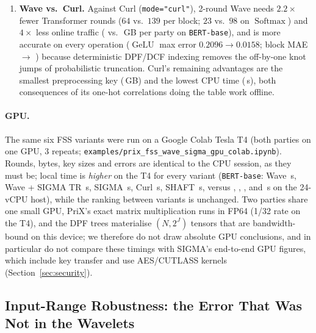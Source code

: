 \documentclass[11pt]{article}
\begin{document}
\begin{enumerate}
    \item \textbf{Wave vs.\ Curl.} Against Curl (\texttt{mode="curl"}), 2-round Wave needs $2.2\times$ fewer Transformer rounds ($64$ vs.\ $139$ per block; $23$ vs.\ $98$ on $\operatorname{Softmax}$) and $4\times$ less online traffic (\BertBaseWaveDetOnlineGB{} vs.\ \BertBaseCurlOnlineGB\,GB per party on \texttt{BERT-base}), and is more accurate on every operation ($\operatorname{GeLU}$ max error $0.2096 \to 0.0158$; block MAE \BertBaseCurlMAE{} $\to$ \BertBaseWaveDetMAE) because deterministic DPF/DCF indexing removes the off-by-one knot jumps of probabilistic truncation. Curl's remaining advantages are the smallest preprocessing key (\BertBaseCurlKeyGB\,GB) and the lowest CPU time (\BertBaseCurlTimeS\,s), both consequences of its one-hot correlations doing the table work offline.
\end{enumerate}

\paragraph{GPU.} The same six FSS variants were run on a Google Colab Tesla T4 (both parties on one GPU, 3 repeats; \texttt{examples/prix\_fss\_wave\_sigma\_gpu\_colab.ipynb}). Rounds, bytes, key sizes and errors are identical to the CPU session, as they must be; local time is \emph{higher} on the T4 for every variant (\texttt{BERT-base}: Wave \GpuBertBaseWaveDetTimeS\,s, Wave + SIGMA TR \GpuBertBaseWaveSigmaTrTimeS\,s, SIGMA \GpuBertBaseSigmaTimeS\,s, Curl \GpuBertBaseCurlTimeS\,s, SHAFT \GpuBertBaseShaftTimeS\,s, versus \BertBaseWaveDetTimeS, \BertBaseWaveSigmaTrTimeS, \BertBaseSigmaTimeS, \BertBaseCurlTimeS{} and \BertBaseShaftTimeS\,s on the 24-vCPU host), while the ranking between variants is unchanged. Two parties share one small GPU, PriX's exact matrix multiplication runs in FP64 (1/32 rate on the T4), and the DPF trees materialise $(N, 2^J)$ tensors that are bandwidth-bound on this device; we therefore do not draw absolute GPU conclusions, and in particular do not compare these timings with SIGMA's end-to-end GPU figures, which include key transfer and use AES/CUTLASS kernels (Section~\ref{sec:security}).

\subsection{Input-Range Robustness: the Error That Was Not in the Wavelets}
\label{sec:range}
\end{document}
